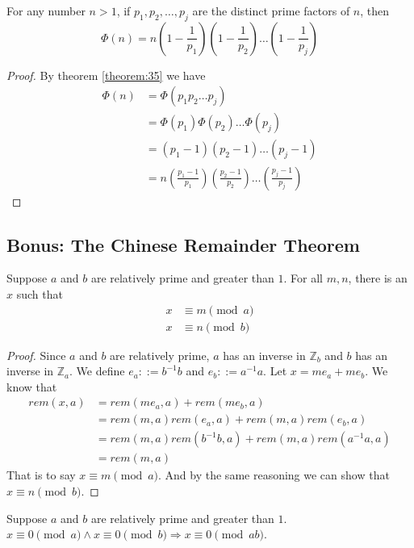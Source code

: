 \documentclass[11pt]{article}
\begin{document}
\begin{corollary}
For any number $n > 1$, if $p_1,p_2,\dots,p_j$ are the distinct prime factors of $n$, then
\[
  \Phi(n)=n\left(1-\frac{1}{p_1}\right)\left(1-\frac{1}{p_2}\right)\dots\left(1-
  \frac{1}{p_j}\right)
\]
\end{corollary}

\begin{proof}
By theorem \ref{theorem:35} we have
\begin{align*}
\Phi(n) &= \Phi(p_1p_2 \dots p_j) \\
&= \Phi(p_1)\Phi(p_2)\dots\Phi(p_j) \\
&= (p_1-1)(p_2-1)\dots(p_j-1) \\
&= n\left(\frac{p_1-1}{p_1}\right)\left(\frac{p_2-1}{p_2}\right)\dots\left(
\frac{p_j-1}{p_j}\right)
\end{align*}

\end{proof}

\subsection{Bonus: The Chinese Remainder Theorem}

\begin{lemma} \label{lemma:2.8.1}
Suppose $a$ and $b$ are relatively prime and greater than $1$. For all $m,n$, there is an
$x$ such that
\begin{align*}
x &\equiv m \pmod{a} \\
x &\equiv n \pmod{b}
\end{align*}
\end{lemma}

\begin{proof}
Since $a$ and $b$ are relatively prime, $a$ has an inverse in $\mathbb{Z}_b$ and $b$ has an
inverse in $\mathbb{Z}_a$. We define $e_a ::= b^{-1}b$ and $e_b ::= a^{-1}a$. Let
$x = me_a + me_b$. We know that
\begin{align*}
rem(x,a) &= rem(me_a,a) + rem(me_b,a) \\
&=rem(m,a)rem(e_a,a) + rem(m,a)rem(e_b,a) \\
&=rem(m,a)rem(b^{-1}b,a) + rem(m,a)rem(a^{-1}a,a) \\
&=rem(m,a)
\end{align*}
That is to say $x \equiv m \pmod{a}$. And by the same reasoning we can show that
$x \equiv n \pmod{b}$.
\end{proof}

\begin{lemma} \label{lemma:2.8.2}
Suppose $a$ and $b$ are relatively prime and greater than $1$.
$x \equiv 0 \pmod{a} \wedge x \equiv 0 \pmod{b} \Rightarrow x \equiv 0 \pmod{ab}$.
\end{lemma}
\end{document}
